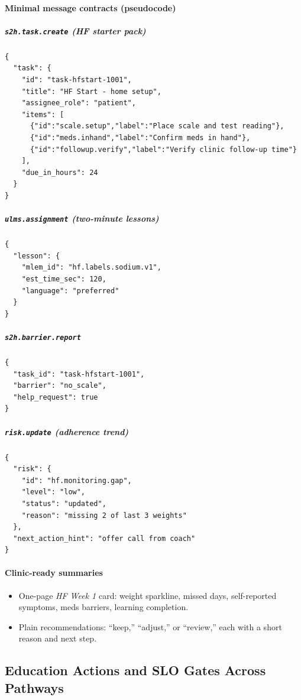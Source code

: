 \documentclass[12pt]{article}
\begin{document}
\paragraph{Minimal message contracts (pseudocode)}
\subparagraph{\texttt{s2h.task.create} (HF starter pack)}
\begin{verbatim}
{
  "task": {
    "id": "task-hfstart-1001",
    "title": "HF Start - home setup",
    "assignee_role": "patient",
    "items": [
      {"id":"scale.setup","label":"Place scale and test reading"},
      {"id":"meds.inhand","label":"Confirm meds in hand"},
      {"id":"followup.verify","label":"Verify clinic follow-up time"}
    ],
    "due_in_hours": 24
  }
}
\end{verbatim}

\subparagraph{\texttt{ulms.assignment} (two-minute lessons)}
\begin{verbatim}
{
  "lesson": {
    "mlem_id": "hf.labels.sodium.v1",
    "est_time_sec": 120,
    "language": "preferred"
  }
}
\end{verbatim}

\subparagraph{\texttt{s2h.barrier.report}}
\begin{verbatim}
{
  "task_id": "task-hfstart-1001",
  "barrier": "no_scale",
  "help_request": true
}
\end{verbatim}

\subparagraph{\texttt{risk.update} (adherence trend)}
\begin{verbatim}
{
  "risk": {
    "id": "hf.monitoring.gap",
    "level": "low",
    "status": "updated",
    "reason": "missing 2 of last 3 weights"
  },
  "next_action_hint": "offer call from coach"
}
\end{verbatim}

\paragraph{Clinic-ready summaries}
\begin{itemize}[leftmargin=*]
  \item One-page \emph{HF Week 1} card: weight sparkline, missed days, self-reported symptoms, meds barriers, learning completion.
  \item Plain recommendations: “keep,” “adjust,” or “review,” each with a short reason and next step.
\end{itemize}

\subsection*{Education Actions and SLO Gates Across Pathways}
\end{document}
